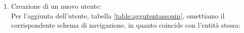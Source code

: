 \documentclass[a4paper,final,12pt]{report}
\begin{document}
\begin{enumerate}
\item Creazione di un nuovo utente:\\
Per l'aggiunta dell'utente, tabella \ref{table:aggutentassouin}, omettiamo il corrispondente schema di navigazione, in quanto coincide con l'entità stessa:

\begin{table}[hbtp]
\centering
{}
\caption{Tabella degli accessi per la creazione di un nuovo utente.}
\label{table:aggutentassouin}
\end{table}

\newpage


\end{enumerate}
\end{document}
